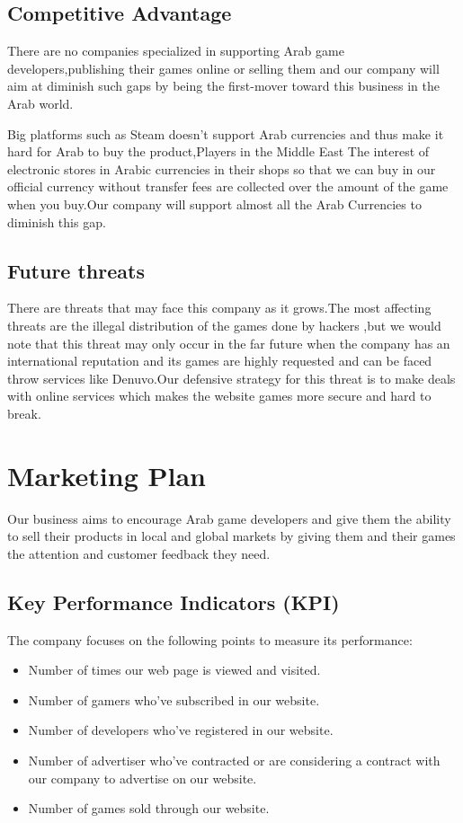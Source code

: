 \documentclass[fontsize=14pt,svgnames]{scrreprt}
\begin{document}
\section{Competitive Advantage}
There are no companies specialized in supporting Arab game developers,publishing
their games online or selling them and our company will aim at diminish such
gaps by being the first-mover toward this business in the Arab world.
\par Big platforms such as Steam doesn’t support Arab currencies and thus make
it hard for Arab to buy the product,Players in the Middle East The interest
of electronic stores in Arabic currencies in their shops so that we can buy in
our official currency without transfer fees are collected over the amount of the
game when you buy.Our company will support almost all the Arab Currencies
to diminish this gap.
\section{Future threats} 
There are threats that may face this company as it grows.The most affecting threats are the illegal distribution of the games done by hackers ,but we would note that this threat may only occur in the far future when the company has an international reputation and its games are highly requested and can be faced throw services like Denuvo.Our defensive strategy for this threat is to make deals with online services which makes the website games more secure and hard to break. 
\chapter{Marketing Plan}
Our business aims to encourage Arab game developers and give them the ability to sell their products in local and global markets  by giving them and their games the attention and customer feedback they need.
\section{Key Performance Indicators (KPI) }
\par The company focuses on the following points to measure its performance:
\begin{itemize}
\item Number of times our web page is viewed and visited.
\item Number of gamers who've subscribed in our website.
\item Number of developers who've registered in our website.
\item Number of advertiser who've contracted or are considering a contract with our company to advertise on our website.
\item Number of games sold through our website.
\end{itemize}
\end{document}
